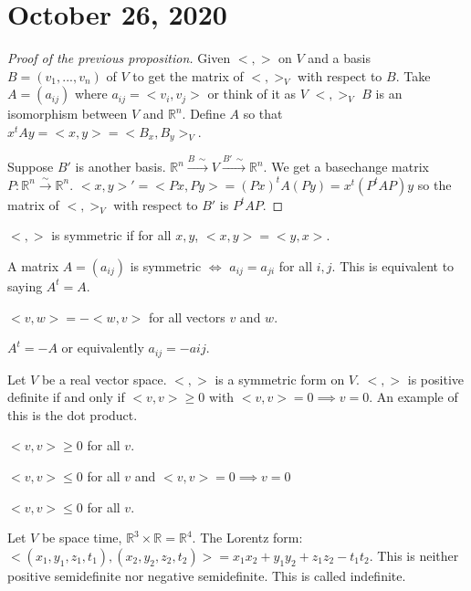 \documentclass{article}
\newcommand{\R}{\mathbb{R}}
\newcommand{\ra}[1][]{\xrightarrow{#1}}
\begin{document}
\section{October 26, 2020}
\begin{proof}[Proof of the previous proposition]
Given $<,>$ on $V$ and a basis $B=(v_1,...,v_n)$ of $V$ to get the matrix of $<,>_V$ with respect to $B$. Take $A=(a_{ij})$ where $a_{ij}=<v_i,v_j>$ or think of it as $V$ $<,>_V$ $B$ is an isomorphism between $V$ and $\R^n$. Define $A$ so that $x^tAy=<x,y>=<B_x,B_y>_V$. 

Suppose $B'$ is another basis. $\R^n\ra[B \, \sim]V\ra[B' \, \sim] \R^n$. We get a basechange matrix $P:\R^n\ra[\sim]\R^n$. $<x,y>'=<Px,Py>=(Px)^tA(Py)=x^t(P^tAP)y$ so the matrix of $<,>_V$ with respect to $B'$ is $P^tAP$.
\end{proof}
\begin{definition}
$<,>$ is symmetric if for all $x,y$, $<x,y>=<y,x>$. 
\end{definition}
\begin{definition}
A matrix $A=(a_{ij})$ is symmetric $\iff$ $a_{ij}=a_{ji}$ for all $i,j$. This is equivalent to saying $A^t=A$. 
\end{definition}
\begin{definition}
$<v,w>=-<w,v>$ for all vectors $v$ and $w$.
\end{definition}
\begin{definition}
$A^t=-A$ or equivalently $a_{ij}=-a{ij}$.
\end{definition}
\begin{definition}
Let $V$ be a real vector space. $<,>$ is a symmetric form on $V$. $<,>$ is positive definite if and only if $<v,v>\geq0$ with $<v,v>=0\implies v=0$. An example of this is the dot product.
\end{definition}
\begin{definition}
$<v,v>\geq 0$ for all $v$.
\end{definition}
\begin{definition}
$<v,v>\leq 0$ for all $v$ and $<v,v>=0\implies v=0$ 
\end{definition}
\begin{definition}
$<v,v>\leq 0$ for all $v$.
\end{definition}
\begin{example}
Let $V$ be space time, $\R^3\times \R=\R^4$. The Lorentz form: $<(x_1,y_1,z_1,t_1),(x_2,y_2,z_2,t_2)>=x_1x_2+y_1y_2+z_1z_2-t_1t_2$. This is neither positive semidefinite nor negative semidefinite. This is called indefinite. 
\end{example}
\end{document}
